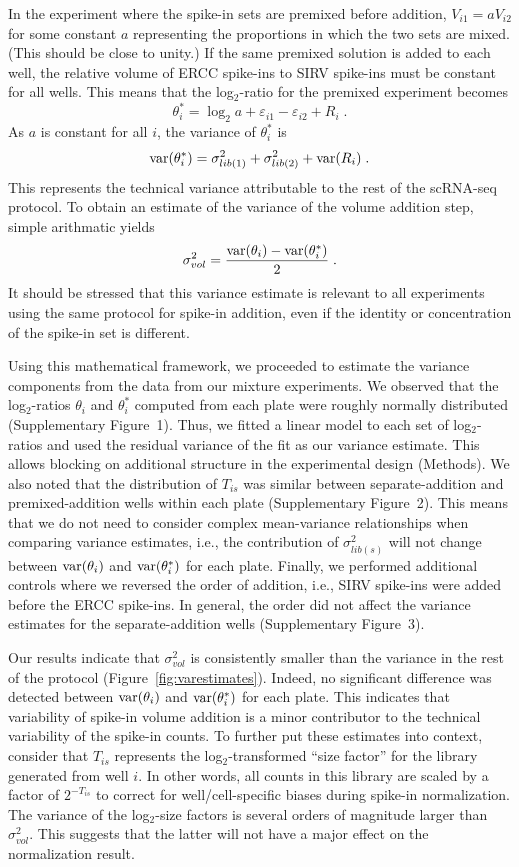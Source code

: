 \documentclass{article}
\newcommand{\suppfignorm}{1}
\newcommand{\suppfigtotals}{2}
\newcommand{\suppfigorder}{3}
\begin{document}
In the experiment where the spike-in sets are premixed before addition, $V_{i1}=aV_{i2}$ for some constant $a$ representing the proportions in which the two sets are mixed.
(This should be close to unity.)
If the same premixed solution is added to each well, the relative volume of ERCC spike-ins to SIRV spike-ins must be constant for all wells.
This means that the log$_2$-ratio for the premixed experiment becomes
\[
\theta^*_i = \log_2 a + \varepsilon_{i1} - \varepsilon_{i2} + R_i \;.
\]
As $a$ is constant for all $i$, the variance of $\theta^*_i$ is
\[
\mbox{var}(\theta^*_i) = \sigma^2_{lib(1)} + \sigma^2_{lib(2)} + \mbox{var}(R_i) \;.
\]
This represents the technical variance attributable to the rest of the scRNA-seq protocol.
To obtain an estimate of the variance of the volume addition step, simple arithmatic yields
\[
\sigma^2_{vol} = \frac{\mbox{var}(\theta_i) - \mbox{var}(\theta^*_i)}{2} \;.
\]
It should be stressed that this variance estimate is relevant to all experiments using the same protocol for spike-in addition, even if the identity or concentration of the spike-in set is different.

Using this mathematical framework, we proceeded to estimate the variance components from the data from our mixture experiments.
We observed that the log$_2$-ratios $\theta_i$ and $\theta^*_i$ computed from each plate were roughly normally distributed (Supplementary Figure~\suppfignorm{}).
Thus, we fitted a linear model to each set of log$_2$-ratios and used the residual variance of the fit as our variance estimate.
This allows blocking on additional structure in the experimental design (Methods).
We also noted that the distribution of $T_{is}$ was similar between separate-addition and premixed-addition wells within each plate (Supplementary Figure~\suppfigtotals{}).
This means that we do not need to consider complex mean-variance relationships when comparing variance estimates, i.e., the contribution of $\sigma^2_{lib(s)}$ will not change between $\mbox{var}(\theta_i)$ and $\mbox{var}(\theta^*_i)$ for each plate.
Finally, we performed additional controls where we reversed the order of addition, i.e., SIRV spike-ins were added before the ERCC spike-ins.
In general, the order did not affect the variance estimates for the separate-addition wells (Supplementary Figure~\suppfigorder{}).

Our results indicate that $\sigma^2_{vol}$ is consistently smaller than the variance in the rest of the protocol (Figure~\ref{fig:varestimates}).
Indeed, no significant difference was detected between $\mbox{var}(\theta_i)$ and $\mbox{var}(\theta^*_i)$ for each plate.
This indicates that variability of spike-in volume addition is a minor contributor to the technical variability of the spike-in counts.
To further put these estimates into context, consider that $T_{is}$ represents the log$_2$-transformed ``size factor'' for the library generated from well $i$.
In other words, all counts in this library are scaled by a factor of $2^{-T_{is}}$ to correct for well/cell-specific biases during spike-in normalization.
The variance of the log$_2$-size factors is several orders of magnitude larger than $\sigma^2_{vol}$.
This suggests that the latter will not have a major effect on the normalization result.
\end{document}
